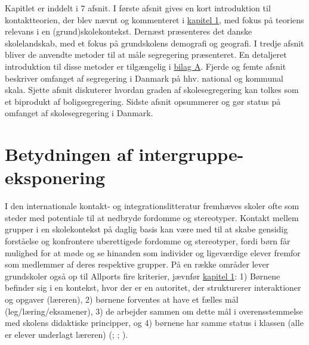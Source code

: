 \documentclass[
]{book}
\begin{document}
Kapitlet er inddelt i 7 afsnit. I første afsnit gives en kort introduktion til kontaktteorien, der blev nævnt og kommenteret i \hyperref[kap1]{kapitel 1}, med fokus på teoriens relevans i en (grund)skolekontekst. Dernæst præsenteres det danske skolelandskab, med et fokus på grundskolens demografi og geografi. I tredje afsnit bliver de anvendte metoder til at måle segregering præsenteret. En detaljeret introduktion til disse metoder er tilgængelig i \hyperref[bilag1]{bilag A}. Fjerde og femte afsnit beskriver omfanget af segregering i Danmark på hhv. national og kommunal skala. Sjette afsnit diskuterer hvordan graden af skolesegregering kan tolkes som et biprodukt af boligsegregering. Sidste afsnit opsummerer og gør status på omfanget af skolesegregering i Danmark.

\section{Betydningen af intergruppe-eksponering}\label{betydningen-af-intergruppe-eksponering}

I den internationale kontakt- og integrationslitteratur fremhæves skoler ofte som steder med potentiale til at nedbryde fordomme og stereotyper. Kontakt mellem grupper i en skolekontekst på daglig basis kan være med til at skabe gensidig forståelse og konfrontere uberettigede fordomme og stereotyper, fordi børn får mulighed for at møde og se hinanden som individer og ligeværdige elever fremfor som medlemmer af deres respektive grupper. På en række områder lever grundskoler også op til Allports fire kriterier, jævnfør \hyperref[kap1]{kapitel 1}: 1) Børnene befinder sig i en kontekst, hvor der er en autoritet, der strukturerer interaktioner og opgaver (læreren), 2) børnene forventes at have et fælles mål (leg/læring/eksamener), 3) de arbejder sammen om dette mål i overensstemmelse med skolens didaktiske principper, og 4) børnene har samme status i klassen (alle er elever underlagt læreren) (; ; ).
\end{document}
